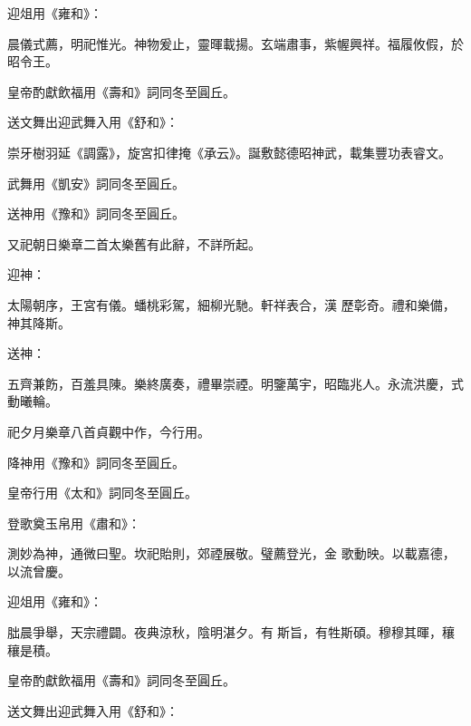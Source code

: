 \begin{pinyinscope}
 迎俎用《雍和》：



 晨儀式薦，明祀惟光。神物爰止，靈暉載揚。玄端肅事，紫幄興祥。福履攸假，於昭令王。



 皇帝酌獻飲福用《壽和》詞同冬至圓丘。



 送文舞出迎武舞入用《舒和》：



 崇牙樹羽延《調露》，旋宮扣律掩《承云》。誕敷懿德昭神武，載集豐功表睿文。



 武舞用《凱安》詞同冬至圓丘。



 送神用《豫和》詞同冬至圓丘。



 又祀朝日樂章二首太樂舊有此辭，不詳所起。



 迎神：



 太陽朝序，王宮有儀。蟠桃彩駕，細柳光馳。軒祥表合，漢
 歷彰奇。禮和樂備，神其降斯。



 送神：



 五齊兼飭，百羞具陳。樂終廣奏，禮畢崇禋。明鑒萬宇，昭臨兆人。永流洪慶，式動曦輪。



 祀夕月樂章八首貞觀中作，今行用。



 降神用《豫和》詞同冬至圓丘。



 皇帝行用《太和》詞同冬至圓丘。



 登歌奠玉帛用《肅和》：



 測妙為神，通微曰聖。坎祀貽則，郊禋展敬。璧薦登光，金
 歌動映。以載嘉德，以流曾慶。



 迎俎用《雍和》：



 朏晨爭舉，天宗禮闢。夜典涼秋，陰明湛夕。有斯旨，有牲斯碩。穆穆其暉，穰穰是積。



 皇帝酌獻飲福用《壽和》詞同冬至圓丘。



 送文舞出迎武舞入用《舒和》：




\end{pinyinscope}
